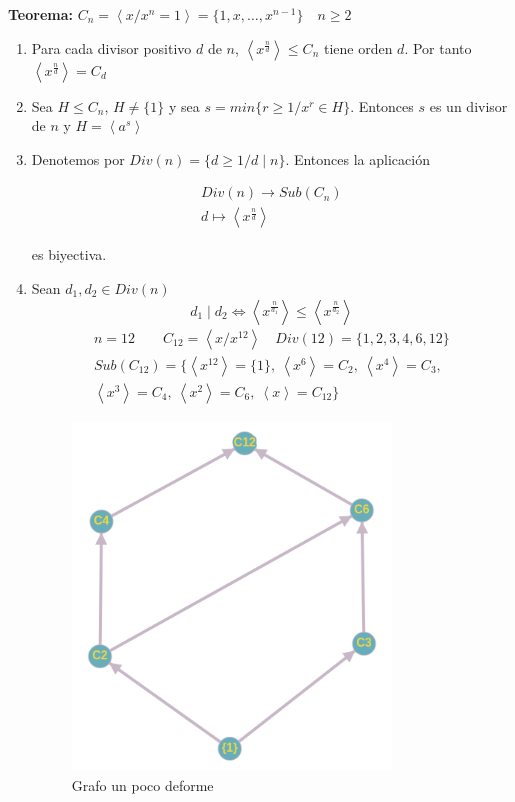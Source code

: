 \documentclass{article}
\begin{document}
\textbf{Teorema:} $C_n=\left\langle x/x^n=1\right\rangle =\{1,x,\ldots,x^{n-1}\}\quad n\geq 2$
\begin{enumerate}[(1)]
\item Para cada divisor positivo $d$ de $n$, $\left\langle x^{\frac{n}{d}}\right\rangle \leq C_n$ tiene orden $d$. Por tanto $\left\langle x^{\frac{n}{d}}\right\rangle=C_d$

\item Sea $H\leq C_n$, $H\neq \{1\}$ y sea $s=min\{r\geq 1/x^r\in H\}$. Entonces $s$ es un divisor de $n$ y $H=\left\langle a^s\right\rangle$

\item Denotemos por $Div(n)=\{d\geq 1/d\mid n\}$. Entonces la aplicación

\begin{gather*}
Div(n)\longrightarrow Sub(C_n)\\
d\longmapsto \left\langle x^{\frac{n}{d}} \right\rangle
\end{gather*}

es biyectiva.

\item Sean $d_1,d_2 \in Div(n)$
\begin{equation*}
d_1\mid d_2 \Leftrightarrow \left\langle x^{\frac{n}{d_1}} \right\rangle \le \left\langle x^{\frac{n}{d_2}}\right\rangle
\end{equation*}
\begin{gather*}
n=12 \qquad C_{12}=\left\langle x /x^{12}\right\rangle \quad Div(12)=\{1,2,3,4,6,12\} \\
Sub(C_{12})=\{\left\langle x^{12}\right\rangle=\{1\},\:\left\langle x^6\right\rangle=C_2,\:\left\langle x^4\right\rangle=C_3,\\
\left\langle x^3\right\rangle = C_4,\:\left\langle x^2\right\rangle=C_6,\:\left\langle x \right\rangle=C_{12}\}
\end{gather*}

\begin{figure}[h]
\centering
\caption{Grafo un poco deforme}
\includegraphics[scale=1,width=0.8\textwidth]{grafo.png}
\end{figure}


\end{enumerate}
\end{document}
